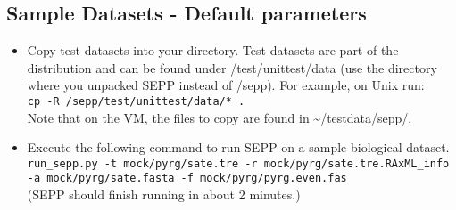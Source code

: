 \documentclass[11pt]{article} %
\newcommand{\sepp}{SEPP\xspace}
\newcommand{\ins}[1]{{\tt #1}}
\newcommand{\file}[1]{{\sf #1}}
\newcommand{\sepphome} {\file{{\raise.17ex\hbox{$\scriptstyle\sim$}}/sepp}\xspace}
\begin{document}
\subsection{Sample Datasets - Default parameters}
\begin{itemize}
\item Copy test datasets into your directory. Test datasets are part of the distribution and can be found under \file{\sepphome/test/unittest/data} (use the directory where you unpacked \sepp instead of \sepphome).
For example, on Unix run:\\ \ins{cp -R \sepphome/test/unittest/data/*  .}\\
Note that on the VM, the files to copy are found in \textasciitilde/testdata/sepp/. 



\item Execute the following command to run \sepp on a sample biological dataset.\\

\ins{run\_sepp.py -t mock/pyrg/sate.tre -r mock/pyrg/sate.tre.RAxML\_info -a mock/pyrg/sate.fasta -f mock/pyrg/pyrg.even.fas} \\

(\sepp should finish running in about 2 minutes.) 
\end{itemize}
\end{document}

